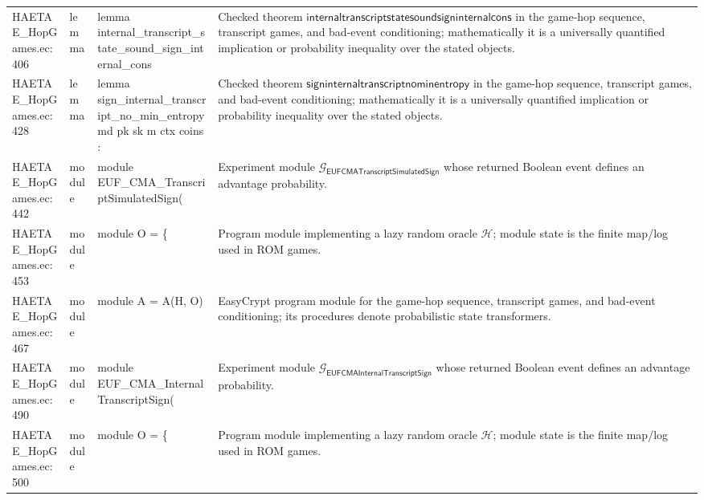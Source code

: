\documentclass[10pt]{article}
\begin{document}
\begin{longtable}{L{0.11\textwidth}L{0.055\textwidth}L{0.385\textwidth}L{0.41\textwidth}}
HAETAE\_\allowbreak{}HopGames.\allowbreak{}ec:\allowbreak{}406 & lemma & {\ttfamily\scriptsize lemma internal\_\allowbreak{}transcript\_\allowbreak{}state\_\allowbreak{}sound\_\allowbreak{}sign\_\allowbreak{}internal\_\allowbreak{}cons} & Checked theorem $\mathsf{internaltranscriptstatesoundsigninternalcons}$ in the game-hop sequence, transcript games, and bad-event conditioning; mathematically it is a universally quantified implication or probability inequality over the stated objects. \\
HAETAE\_\allowbreak{}HopGames.\allowbreak{}ec:\allowbreak{}428 & lemma & {\ttfamily\scriptsize lemma sign\_\allowbreak{}internal\_\allowbreak{}transcript\_\allowbreak{}no\_\allowbreak{}min\_\allowbreak{}entropy md pk sk m ctx coins :} & Checked theorem $\mathsf{signinternaltranscriptnominentropy}$ in the game-hop sequence, transcript games, and bad-event conditioning; mathematically it is a universally quantified implication or probability inequality over the stated objects. \\
HAETAE\_\allowbreak{}HopGames.\allowbreak{}ec:\allowbreak{}442 & module & {\ttfamily\scriptsize module EUF\_\allowbreak{}CMA\_\allowbreak{}TranscriptSimulatedSign(} & Experiment module $\mathcal G_{\mathsf{EUFCMATranscriptSimulatedSign}}$ whose returned Boolean event defines an advantage probability. \\
HAETAE\_\allowbreak{}HopGames.\allowbreak{}ec:\allowbreak{}453 & module & {\ttfamily\scriptsize module O = \{} & Program module implementing a lazy random oracle $\mathcal H$; module state is the finite map/log used in ROM games. \\
HAETAE\_\allowbreak{}HopGames.\allowbreak{}ec:\allowbreak{}467 & module & {\ttfamily\scriptsize module A = A(H, O)} & EasyCrypt program module for the game-hop sequence, transcript games, and bad-event conditioning; its procedures denote probabilistic state transformers. \\
HAETAE\_\allowbreak{}HopGames.\allowbreak{}ec:\allowbreak{}490 & module & {\ttfamily\scriptsize module EUF\_\allowbreak{}CMA\_\allowbreak{}InternalTranscriptSign(} & Experiment module $\mathcal G_{\mathsf{EUFCMAInternalTranscriptSign}}$ whose returned Boolean event defines an advantage probability. \\
HAETAE\_\allowbreak{}HopGames.\allowbreak{}ec:\allowbreak{}500 & module & {\ttfamily\scriptsize module O = \{} & Program module implementing a lazy random oracle $\mathcal H$; module state is the finite map/log used in ROM games. \\

\end{longtable}
\end{document}
